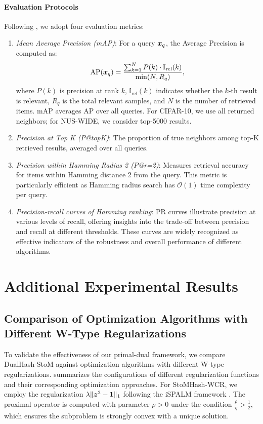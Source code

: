\paragraph{Evaluation Protocols}
Following \cite{liuDeepSupervisedHashing}, we adopt four evaluation metrics:

\begin{enumerate}[label=\textup{(\roman{*})}, leftmargin=2em]
    \item \textit{Mean Average Precision (mAP)}: For a query $\bm{x}_q$, the Average Precision is computed as:
    \[
        \text{AP}(\bm{x}_q) = \frac{\sum_{k=1}^{N} P(k) \cdot \mathbb{I}_{\text{rel}}(k)}{\min(N, R_q)},
    \]
    where $P(k)$ is precision at rank $k$, $\mathbb{I}_{\text{rel}}(k)$ indicates whether the $k$-th result is relevant, $R_q$ is the total relevant samples, and $N$ is the number of retrieved items. mAP averages AP over all queries. For CIFAR-10, we use all returned neighbors; for NUS-WIDE, we consider top-5000 results.
    
    \item \textit{Precision at Top K (P@topK)}: The proportion of true neighbors among top-K retrieved results, averaged over all queries.
    
    \item \textit{Precision within Hamming Radius 2 (P@r=2)}: Measures retrieval accuracy for items within Hamming distance 2 from the query. This metric is particularly efficient as Hamming radius search has $\mathcal{O}(1)$ time complexity per query.
    
    \item \textit{Precision-recall curves of Hamming ranking}: PR curves illustrate
        precision at various levels of recall, offering insights into the trade-off between precision and recall at different thresholds. These curves are widely
        recognized as effective indicators of the robustness and overall performance
        of different algorithms.
\end{enumerate}

\section{Additional Experimental Results}
\subsection{Comparison of Optimization Algorithms with Different W-Type Regularizations}
To validate the effectiveness of our primal-dual framework, we compare DualHash-StoM
against optimization algorithms with different W-type regularizations. 
summarizes the configurations of different regularization functions and their corresponding optimization approaches. For StoMHash-WCR, we employ the regularization $\lambda \| \bm{z}^{2}- \mathbf{1}\|_1$
following the iSPALM framework \cite{InertialProximalAlternating}. The proximal
operator is computed with parameter $\rho > 0$ under the condition
$\frac{\rho}{\eta}> \frac{1}{2}$, which ensures the subproblem is strongly convex
with a unique solution.

